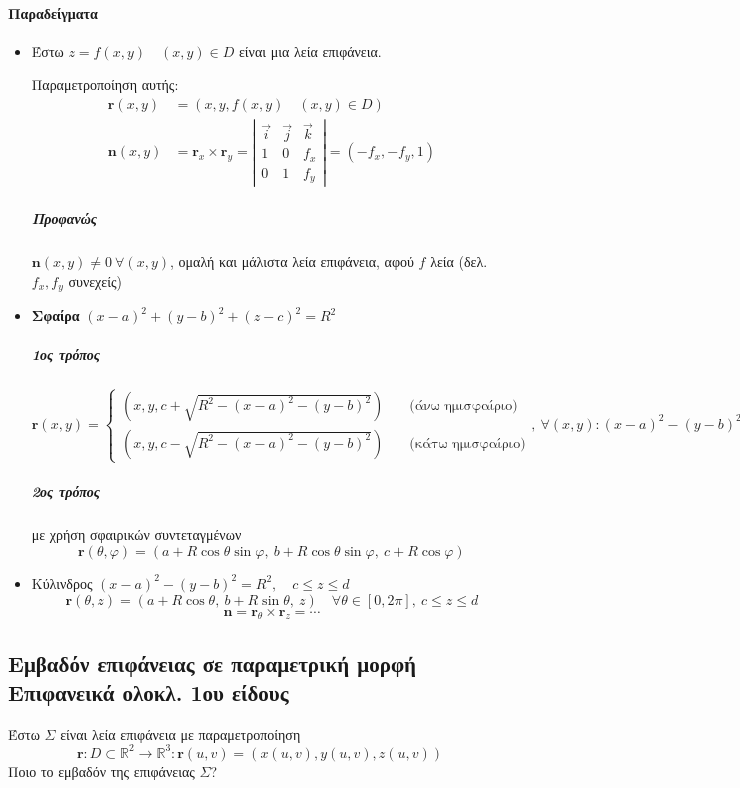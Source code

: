 \documentclass[11pt,a4paper,titlepage,draft]{article}
\begin{document}

\paragraph{Παραδείγματα}
\begin{itemize}
\item Έστω \( z = f(x,y)  \quad (x,y) \in D \) είναι μια λεία επιφάνεια.

Παραμετροποίηση αυτής:
\begin{align*}
\mathbf r(x,y) &= \left(x,y,f(x,y) \quad (x,y)\in D \right) \\
\mathbf n(x,y) &= \mathbf r_x \times \mathbf r_y = \left|
\begin{matrix}
\vec i & \vec j & \vec k \\
1 & 0 & f_x \\
0 & 1 & f_y
\end{matrix}
\right| = \left(-f_x,-f_y,1\right)
\end{align*}
\subparagraph{Προφανώς} \( \mathbf n(x,y) \neq 0 \ \forall (x,y) \), ομαλή και μάλιστα λεία επιφάνεια, αφού \( f \) λεία (δελ. \( f_x,f_y \) συνεχείς)
\item \textbf{Σφαίρα} \( (x-a)^2+(y-b)^2+(z-c)^2=R^2 \)
\subparagraph{1ος τρόπος}
\[
\mathbf{r}(x,y) = \begin{cases}
\left(x,y,c+\sqrt{R^2-(x-a)^2-(y-b)^2}\right) \quad& \text{(άνω ημισφαίριο)} \\
\left(x,y,c-\sqrt{R^2-(x-a)^2-(y-b)^2}\right) \quad& \text{(κάτω ημισφαίριο)}
\end{cases},\ \forall (x,y): (x-a)^2-(y-b)^2\leq R
\]
\subparagraph{2ος τρόπος}
με χρήση σφαιρικών συντεταγμένων
\[
\mathbf r(\theta,\varphi) = \left(
a+R\cos\theta\sin\varphi,\ b+R\cos\theta\sin\varphi,\ c+R\cos\varphi
\right)
\]
\item Κύλινδρος \( (x-a)^2-(y-b)^2=R^2 , \quad c\leq z \leq d \)
\[
\mathbf r(\theta,z) = \left(
a+R\cos\theta,\ b+R\sin\theta,\ z
\right) \quad \forall \theta \in [0,2\pi],\ c\leq z \leq d
\]
\[
\mathbf n = \mathbf r_\theta \times \mathbf r_z = \cdots
\]
\end{itemize}

\subsection{Εμβαδόν επιφάνειας σε παραμετρική μορφή\\Επιφανεικά ολοκλ. 1ου είδους}
Έστω \( \varSigma \) είναι λεία επιφάνεια με παραμετροποίηση
\[
\mathbf r: D \subset \mathbb R ^2 \to \mathbb R ^3: \mathbf r(u,v) = \left(
x(u,v),y(u,v),z(u,v)
\right)
\]
Ποιο το εμβαδόν της επιφάνειας \( \varSigma \)?
\end{document}
